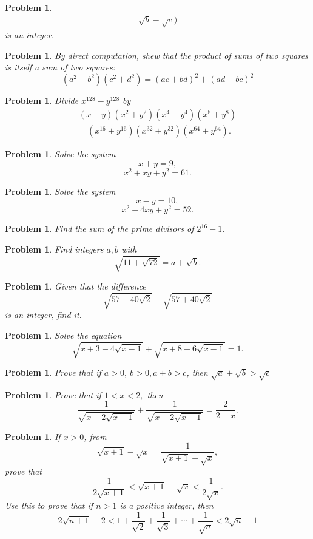 \documentclass[11pt, openany]{book}
\theoremstyle{change} \theoremheaderfont{\blue\sffamily\bfseries}
\newtheorem{pro}[thm]{Problem}
\theoremstyle{nonumberplain} \theoremheaderfont{\sffamily\bfseries}
\newcommand{\í}{\'{\i}}
\begin{document}
\begin{multicols}{2}
\begin{pro}
$$\begin{array}{l}
\sqrt{b} - \sqrt{c})\end{array}$$is an integer.
\end{pro}
\begin{pro} By direct computation, shew that the product of sums of two squares is itself a
sum of two squares:
\begin{equation}
(a^2 + b^2)(c^2 + d^2) = (ac + bd)^2 + (ad - bc)^2 \end{equation}
\end{pro}
\begin{pro}
 Divide $x^{128} - y^{128}$ by
 $$\begin{array}{l}(x + y)(x^2 + y^2)(x^4 + y^4)(x^8 + y^8)\\ \quad (x^{16} + y^{16})(x^{32} + y^{32})(x^{64} + y^{64}).
 \end{array}$$
 \end{pro}
\begin{pro}
Solve the system
$$x + y = 9,$$$$x^2 + xy + y^2 = 61.$$
\end{pro}
\begin{pro}
Solve the system
$$x - y = 10,$$$$x^2 - 4xy + y^2 = 52.$$
\end{pro}
\begin{pro}
Find the sum of the prime divisors of $2^{16} - 1.$
\end{pro}
\begin{pro}  Find integers $a, b$ with
$$\sqrt{11 + \sqrt{72}} = a + \sqrt{b}.$$\end{pro}
\begin{pro}
Given that the difference $$\sqrt{57 - 40\sqrt{2}} - \sqrt{57 +
40\sqrt{2}}$$is an integer, find it.
\end{pro}
\begin{pro}
Solve the equation
$$\sqrt{x + 3 - 4\sqrt{x - 1}} + \sqrt{x + 8 - 6\sqrt{x - 1}}= 1.$$
\end{pro}
\begin{pro}
Prove that if $a > 0, \ b > 0, a + b > c$, then $\sqrt{a} +
\sqrt{b} > \sqrt{c}$
\end{pro}
\begin{pro}
Prove that if $1 < x < 2,$ then
$$\frac{1}{\sqrt{x + 2\sqrt{x - 1}}} + \frac{1}{\sqrt{x - 2\sqrt{x - 1}}} = \frac{2}{2 - x}.$$
\end{pro}
\begin{pro}
If $x > 0$, from
$$\sqrt{x + 1} - \sqrt{x} = \frac{1}{\sqrt{x + 1} + \sqrt{x}},$$prove that
$$\frac{1}{2\sqrt{x + 1}} < \sqrt{x + 1} - \sqrt{x} < \frac{1}{2\sqrt{x}}.$$
Use this to prove that if  $n > 1$ is a positive integer, then
$$2\sqrt{n + 1} - 2 < 1 + \frac{1}{\sqrt{2}} + \frac{1}{\sqrt{3}} + \cdots + \frac{1}{\sqrt{n}}  < 2\sqrt{n} - 1$$
\end{pro}


\end{multicols}
\end{document}
